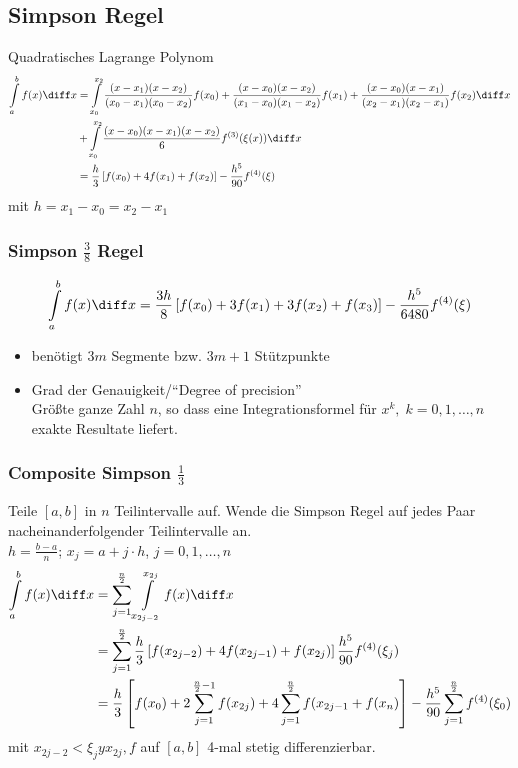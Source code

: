 \subsection{Simpson Regel}
Quadratisches Lagrange Polynom
\begin{equation}
\begin{split}
\int\limits_a^bf(x)\diff x &= \int\limits_{x_0}^{x_2}\frac{(x-x_1)(x-x_2)}{(x_0-x_1)(x_0-x_2)}f(x_0) + \frac{(x-x_0)(x-x_2)}{(x_1-x_0)(x_1-x_2)}f(x_1) + \frac{(x-x_0)(x-x_1)}{(x_2-x_1)(x_2-x_1)}f(x_2)\diff x\\ &+ \int\limits_{x_0}^{x_2}\frac{(x-x_0)(x-x_1)(x-x_2)}{6}f^{(3)}(\xi(x))\diff x\\
&= \frac{h}{3}\left[f(x_0)+4f(x_1)+f(x_2)\right]-\frac{h^5}{90}f^{(4)}(\xi)
\end{split}
\end{equation}
mit $h=x_1-x_0 = x_2-x_1$

\subsubsection{Simpson $\frac{3}{8}$ Regel}
\begin{equation}
\int\limits_a^bf(x)\diff x = \frac{3h}{8}\left[f(x_0)+3f(x_1)+3f(x_2)+f(x_3)\right]-\frac{h^5}{6480}f^{(4)}(\xi)
\end{equation}
\begin{itemize}
\item benötigt $3m$ Segmente bzw. $3m+1$ Stützpunkte
\item Grad der Genauigkeit/"`Degree of precision"'\\
Größte ganze Zahl $n$, so dass eine Integrationsformel für $x^k,\; k=0,1,\ldots,n$ exakte Resultate liefert.
\end{itemize}

\subsubsection{Composite Simpson $\frac{1}{3}$}
Teile $[a,b]$ in $n$ Teilintervalle auf. Wende die Simpson Regel auf jedes Paar nacheinanderfolgender Teilintervalle an.\\
$h = \frac{b-a}{n}$; $x_j=a+j\cdot h$, $j=0,1,\ldots ,n$
\begin{equation}
\begin{split}
\int\limits_a^bf(x)\diff x &= \sum_{j=1}^{\frac{n}{2}}\int\limits_{x_{2j-2}}^{x_{2j}}f(x)\diff x\\
&= \sum_{j=1}^{\frac{n}{2}}\frac{h}{3}\left[f(x_{2j-2})+4f(x_{2j-1})+f(x_{2j})\right]\frac{h^5}{90}f^{(4)}(\xi_j)\\
&= \frac{h}{3}\left[f(x_0)+2\sum_{j=1}^{\frac{n}{2}-1}f(x_{2j}) + 4\sum_{j=1}^{\frac{n}{2}}f(x_{2j-1} + f(x_n)\right] - \frac{h^5}{90}\sum_{j=1}^{\frac{n}{2}}f^{(4)}(\xi_0)
\end{split}
\end{equation}
mit $x_{2j-2} < \xi_j y x_{2j}, f$ auf $[a,b]$ 4-mal stetig differenzierbar.

